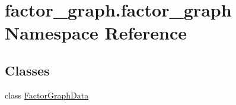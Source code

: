 \hypertarget{namespacefactor__graph_1_1factor__graph}{}\section{factor\+\_\+graph.\+factor\+\_\+graph Namespace Reference}
\label{namespacefactor__graph_1_1factor__graph}
\subsection*{Classes}
\begin{DoxyCompactItemize}
\item
class \hyperlink{classfactor__graph_1_1factor__graph_1_1FactorGraphData}{Factor\+Graph\+Data}
\end{DoxyCompactItemize}
